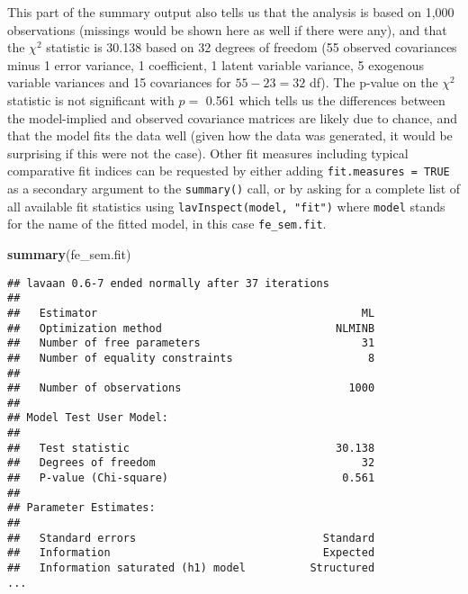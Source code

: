 \documentclass[]{interact}
\theoremstyle{plain}%
\theoremstyle{definition}
\theoremstyle{remark}
\newenvironment{Shaded}{\begin{snugshade}}{\end{snugshade}}
\newcommand{\KeywordTok}[1]{\textcolor[rgb]{0.13,0.29,0.53}{\textbf{#1}}}
\newcommand{\NormalTok}[1]{#1}
\begin{document}
This part of the summary output also tells us that the analysis is based
on 1,000 observations (missings would be shown here as well if there
were any), and that the \(\chi^{2}\) statistic is 30.138 based on 32
degrees of freedom (55 observed covariances minus 1 error variance, 1
coefficient, 1 latent variable variance, 5 exogenous variable variances
and 15 covariances for \(55 - 23 = 32\) df). The p-value on the
\(\chi^{2}\) statistic is not significant with \(p =\) 0.561 which tells
us the differences between the model-implied and observed covariance
matrices are likely due to chance, and that the model fits the data well
(given how the data was generated, it would be surprising if this were
not the case). Other fit measures including typical comparative fit
indices can be requested by either adding \texttt{fit.measures\ =\ TRUE}
as a secondary argument to the \texttt{summary()} call, or by asking for
a complete list of all available fit statistics using
\texttt{lavInspect(model,\ "fit")} where \texttt{model} stands for the
name of the fitted model, in this case \texttt{fe\_sem.fit}.

\singlespacing

\begin{Shaded}
\begin{Highlighting}[]
\KeywordTok{summary}\NormalTok{(fe\_sem.fit)}
\end{Highlighting}
\end{Shaded}

\begin{verbatim}
## lavaan 0.6-7 ended normally after 37 iterations
## 
##   Estimator                                         ML
##   Optimization method                           NLMINB
##   Number of free parameters                         31
##   Number of equality constraints                     8
##                                                       
##   Number of observations                          1000
##                                                       
## Model Test User Model:
##                                                       
##   Test statistic                                30.138
##   Degrees of freedom                                32
##   P-value (Chi-square)                           0.561
## 
## Parameter Estimates:
## 
##   Standard errors                             Standard
##   Information                                 Expected
##   Information saturated (h1) model          Structured
...
\end{verbatim}

\doublespacing
\end{document}
